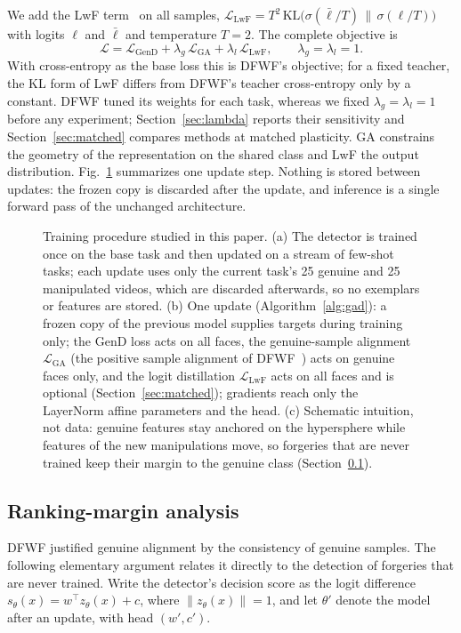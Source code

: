 \documentclass[journal]{IEEEtran}
\begin{document}
We add the LwF term~\cite{li2018lwf} on all samples, $\mathcal{L}_{\mathrm{LwF}}=T^2\,\mathrm{KL}\big(\sigma(\bar\ell/T)\,\|\,\sigma(\ell/T)\big)$ with logits $\ell$ and $\bar\ell$ and temperature $T=2$. The complete objective is
\begin{equation}
\mathcal{L}=\mathcal{L}_{\mathrm{GenD}}+\lambda_{g}\,\mathcal{L}_{\mathrm{GA}}+\lambda_{l}\,\mathcal{L}_{\mathrm{LwF}},\qquad \lambda_g=\lambda_l=1 .
\end{equation}
With cross-entropy as the base loss this is DFWF's objective; for a fixed teacher, the KL form of LwF differs from DFWF's teacher cross-entropy only by a constant. DFWF tuned its weights for each task, whereas we fixed $\lambda_g=\lambda_l=1$ before any experiment; Section~\ref{sec:lambda} reports their sensitivity and Section~\ref{sec:matched} compares methods at matched plasticity. GA constrains the geometry of the representation on the shared class and LwF the output distribution. Fig.~\ref{fig:method} summarizes one update step. Nothing is stored between updates: the frozen copy is discarded after the update, and inference is a single forward pass of the unchanged architecture.

\begin{figure}[t]
\centering

\caption{Training procedure studied in this paper. (a) The detector is trained once on the base task and then updated on a stream of few-shot tasks; each update uses only the current task's 25 genuine and 25 manipulated videos, which are discarded afterwards, so no exemplars or features are stored. (b) One update (Algorithm~\ref{alg:gad}): a frozen copy of the previous model supplies targets during training only; the GenD loss acts on all faces, the genuine-sample alignment $\mathcal{L}_{\mathrm{GA}}$ (the positive sample alignment of DFWF~\cite{ma2021dfwf}) acts on genuine faces only, and the logit distillation $\mathcal{L}_{\mathrm{LwF}}$ acts on all faces and is optional (Section~\ref{sec:matched}); gradients reach only the LayerNorm affine parameters and the head. (c) Schematic intuition, not data: genuine features stay anchored on the hypersphere while features of the new manipulations move, so forgeries that are never trained keep their margin to the genuine class (Section~\ref{sec:theory}).}
\label{fig:method}
\end{figure}

\subsection{Ranking-margin analysis}
\label{sec:theory}
DFWF justified genuine alignment by the consistency of genuine samples. The following elementary argument relates it directly to the detection of forgeries that are never trained. Write the detector's decision score as the logit difference $s_\theta(x)=w^{\top}z_\theta(x)+c$, where $\|z_\theta(x)\|=1$, and let $\theta'$ denote the model after an update, with head $(w',c')$.
\end{document}
